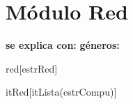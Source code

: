 \section{M\'odulo Red}

\begin{Interfaz}
  
  \textbf{se explica con:} 
  \textbf{g\'eneros:} 
  
\end{Interfaz}

\begin{Representacion}

  \begin{Estructura}{red}[estrRed]

    \begin{Tupla}[estrRed]
    \end{Tupla}

    \begin{Tupla}[estrCompu]
    \end{Tupla}

  \end{Estructura}

  \begin{Estructura}{itRed}[itLista(estrCompu)]
  \end{Estructura}

\end{Representacion}